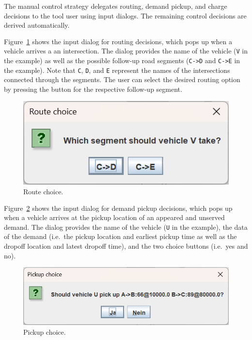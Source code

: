\documentclass[10pt,twocolumn]{article}
\begin{document}
The manual control strategy delegates routing, demand pickup, and charge decisions to the tool user using input dialogs.
The remaining control decisions are derived automatically.

Figure~\ref{fig:manual-controller-route} shows the input dialog for routing decisions, which pops up when a vehicle arrives a an intersection.
The dialog provides the name of the vehicle (\texttt{V} in the example) as well as the possible follow-up road segments (\texttt{C->D} and \texttt{C->E} in the example).
Note that \texttt{C}, \texttt{D}, and \texttt{E} represent the names of the intersections connected through the segments.
The user can select the desired routing option by pressing the button for the respective follow-up segment.

\begin{figure}[!ht]
    \centering
    \includegraphics[scale=0.4]{../../screenshots/manual-controller-route.png}
    \caption{Route choice.}
    \label{fig:manual-controller-route}
\end{figure}

Figure~\ref{fig:manual-controller-demand} shows the input dialog for demand pickup decisions, which pops up when a vehicle arrives at the pickup location of an appeared and unserved demand.
The dialog provides the name of the vehicle (\texttt{U} in the example), the data of the demand (i.e.\ the pickup location and earliest pickup time as well as the dropoff location and latest dropoff time), and the two choice buttons (i.e.\ yes and no).

\begin{figure}[!ht]
    \centering
    \includegraphics[scale=0.4]{../../screenshots/manual-controller-demand.png}
    \caption{Pickup choice.}
    \label{fig:manual-controller-demand}
\end{figure}
\end{document}

